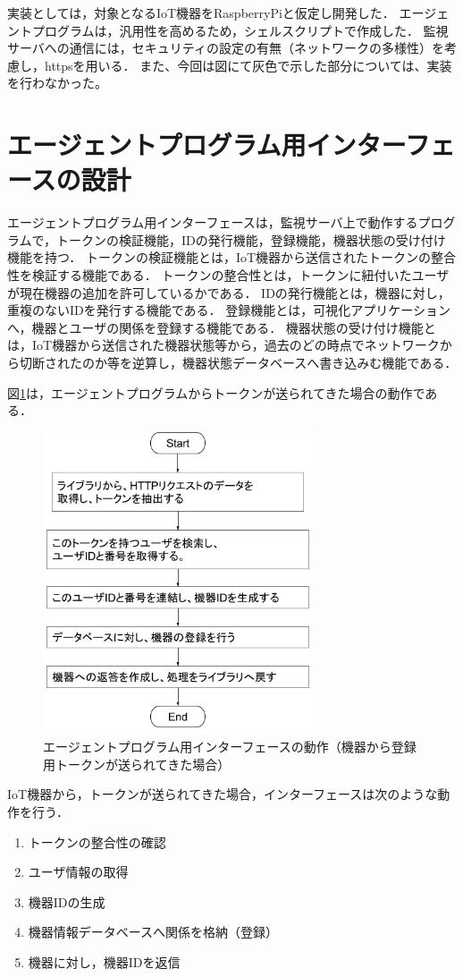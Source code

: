 実装としては，対象となるIoT機器をRaspberryPiと仮定し開発した．
エージェントプログラムは，汎用性を高めるため，シェルスクリプトで作成した．
監視サーバへの通信には，セキュリティの設定の有無（ネットワークの多様性）を考慮し，httpsを用いる．
また、今回は図にて灰色で示した部分については、実装を行わなかった。


\section{エージェントプログラム用インターフェースの設計}
エージェントプログラム用インターフェースは，監視サーバ上で動作するプログラムで，トークンの検証機能，IDの発行機能，登録機能，機器状態の受け付け機能を持つ．
トークンの検証機能とは，IoT機器から送信されたトークンの整合性を検証する機能である．
トークンの整合性とは，トークンに紐付いたユーザが現在機器の追加を許可しているかである．
IDの発行機能とは，機器に対し，重複のないIDを発行する機能である．
登録機能とは，可視化アプリケーションへ，機器とユーザの関係を登録する機能である．
機器状態の受け付け機能とは，IoT機器から送信された機器状態等から，過去のどの時点でネットワークから切断されたのか等を逆算し，機器状態データベースへ書き込みむ機能である．

図\ref{fig:interface_flowA}は，エージェントプログラムからトークンが送られてきた場合の動作である．
\begin{figure}[htbp]
\begin{center}
\includegraphics[width=8cm]{images/interface_flow.png}
\caption{エージェントプログラム用インターフェースの動作（機器から登録用トークンが送られてきた場合）}
\label{fig:interface_flowA}
\end{center}
\end{figure}
IoT機器から，トークンが送られてきた場合，インターフェースは次のような動作を行う．
\begin{enumerate}
\item トークンの整合性の確認
\item ユーザ情報の取得
\item 機器IDの生成
\item 機器情報データベースへ関係を格納（登録）
\item 機器に対し，機器IDを返信
\end{enumerate}


